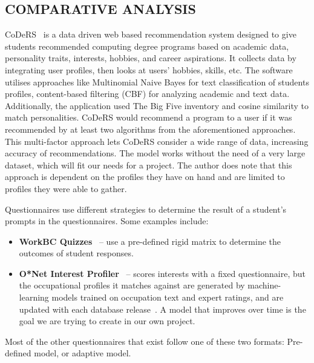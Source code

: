 \documentclass[sigconf]{acmart}
\begin{document}
\subsection{COMPARATIVE ANALYSIS}
CoDeRS~\cite{rances} is a data driven web based recommendation system designed to give students recommended computing degree programs based on academic data, personality traits, interests, hobbies, and career aspirations. It collects data by integrating user profiles, then looks at users' hobbies, skills, etc. The software utilises approaches like Multinomial Naive Bayes for text classification of students profiles, content-based filtering (CBF) for analyzing academic and text data. Additionally, the application used The Big Five inventory and cosine similarity to match personalities. CoDeRS would recommend a program to a user if it was recommended by at least two algorithms from the aforementioned approaches.
This multi-factor approach lets CoDeRS consider a wide range of data, increasing accuracy of recommendations. The model works without the need of a very large dataset, which will fit our needs for a project. The author does note that this approach is dependent on the profiles they have on hand and are limited to profiles they were able to gather.

Questionnaires use different strategies to determine the result of a student's prompts in the questionnaires. Some examples include:

\begin{itemize}
    \item \textbf{WorkBC Quizzes}~\cite{workbc} -- use a pre-defined rigid matrix to determine the outcomes of student responses.
    \item \textbf{O*Net Interest Profiler}~\cite{onet} -- scores interests with a fixed questionnaire, but the occupational profiles it matches against are generated by machine-learning models trained on occupation text and expert ratings, and are updated with each database release~\cite{javalagi}. A model that improves over time is the goal we are trying to create in our own project.
\end{itemize}
Most of the other questionnaires that exist follow one of these two formats: Pre-defined model, or adaptive model.
\end{document}
